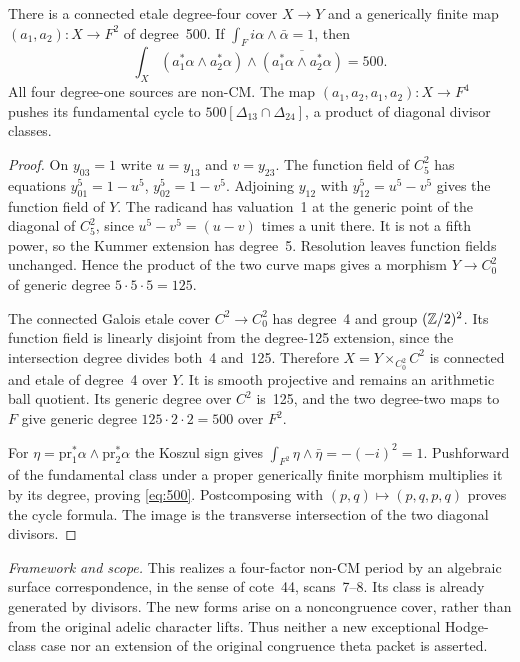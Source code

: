 \documentclass[11pt]{article}
\newcommand{\framework}[1]{\par\smallskip\noindent\textit{Framework and scope.} #1\par}
\theoremstyle{definition}\newtheorem{definition}[theorem]{Definition}\newtheorem{remark}[theorem]{Remark}
\begin{document}
There is a connected etale degree-four cover $X\to Y$ and a generically finite map $(a_1,a_2):X\to F^2$ of degree~500. If
$\int_F i\alpha\wedge\bar\alpha=1$, then
\begin{equation}\label{eq:500}
 \int_X(a_1^*\alpha\wedge a_2^*\alpha)
 \wedge\overline{(a_1^*\alpha\wedge a_2^*\alpha)}=500.
\end{equation}
All four degree-one sources are non-CM. The map
$(a_1,a_2,a_1,a_2):X\to F^4$ pushes its fundamental cycle to
$500[\Delta_{13}\cap\Delta_{24}]$, a product of diagonal divisor classes.
\begin{proof}
On $y_{03}=1$ write $u=y_{13}$ and $v=y_{23}$. The function field of $C_5^2$ has equations
$y_{01}^5=1-u^5$, $y_{02}^5=1-v^5$. Adjoining $y_{12}$ with
$y_{12}^5=u^5-v^5$ gives the function field of $Y$. The radicand has valuation~1 at the generic point of the diagonal of $C_5^2$, since $u^5-v^5=(u-v)$ times a unit there. It is not a fifth power, so the Kummer extension has degree~5. Resolution leaves function fields unchanged. Hence the product of the two curve maps gives a morphism $Y\to C_0^2$ of generic degree $5\cdot5\cdot5=125$.

The connected Galois etale cover $C^2\to C_0^2$ has degree~4 and group $(\mathbb Z/2)^2$. Its function field is linearly disjoint from the degree-125 extension, since the intersection degree divides both~4 and~125. Therefore
$X=Y\times_{C_0^2}C^2$ is connected and etale of degree~4 over $Y$. It is smooth projective and remains an arithmetic ball quotient. Its generic degree over $C^2$ is~125, and the two degree-two maps to $F$ give generic degree $125\cdot2\cdot2=500$ over $F^2$.

For $\eta=\mathrm{pr}_1^*\alpha\wedge\mathrm{pr}_2^*\alpha$ the Koszul sign gives
$\int_{F^2}\eta\wedge\bar\eta=-(-i)^2=1$.
Pushforward of the fundamental class under a proper generically finite morphism multiplies it by its degree, proving \eqref{eq:500}. Postcomposing with $(p,q)\mapsto(p,q,p,q)$ proves the cycle formula. The image is the transverse intersection of the two diagonal divisors.
\end{proof}
\framework{This realizes a four-factor non-CM period by an algebraic surface correspondence, in the sense of cote~44, scans~7--8. Its class is already generated by divisors. The new forms arise on a noncongruence cover, rather than from the original adelic character lifts. Thus neither a new exceptional Hodge-class case nor an extension of the original congruence theta packet is asserted.}
\end{document}
